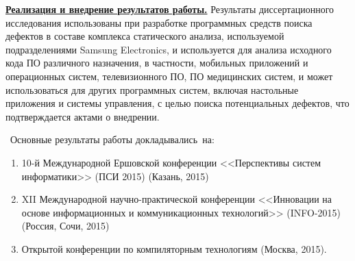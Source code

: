
\underline{\textbf{Реализация и внедрение результатов работы.}} Результаты диссертационного исследования использованы при разработке программных средств поиска дефектов в составе комплекса статического анализа, используемой подразделениями Samsung Electronics, и используется для анализа исходного кода ПО различного назначения, в частности, мобильных приложений и операционных систем, телевизионного ПО, ПО медицинских систем, и может использоваться для других программных систем, включая настольные приложения и системы управления, с целью поиска потенциальных дефектов, что подтверждается актами о внедрении.

\probation\
Основные результаты работы докладывались~на:
\begin{enumerate}[leftmargin=1em]
 \item 10-й Международной Ершовской конференции <<Перспективы систем информатики>> (ПСИ 2015) (Казань, 2015)
 \item XII Международной научно-практической конференции <<Инновации на основе информационных и коммуникационных технологий>> (INFO-2015) (Россия, Сочи, 2015)
 \item Открытой конференции по компиляторным технологиям (Москва, 2015).
\end{enumerate}


